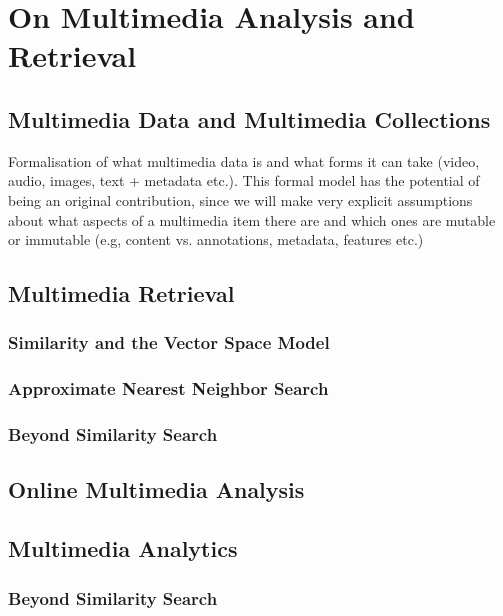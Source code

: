 \chapter{On Multimedia Analysis and Retrieval}

\section{Multimedia Data and Multimedia Collections}
\label{section:multmedia_data}
Formalisation of what multimedia data is and what forms it can take (video, audio, images, text + metadata etc.). This formal model has the potential of being an original contribution, since we will make very explicit assumptions about what aspects of a multimedia item there are and which ones are mutable or immutable (e.g, content vs. annotations, metadata, features etc.)

\section{Multimedia Retrieval}

\subsection{Similarity and the Vector Space Model}
\subsection{Approximate Nearest Neighbor Search}


\subsection{Beyond Similarity Search}

\section{Online Multimedia Analysis}

\section{Multimedia Analytics}

\subsection{Beyond Similarity Search}

